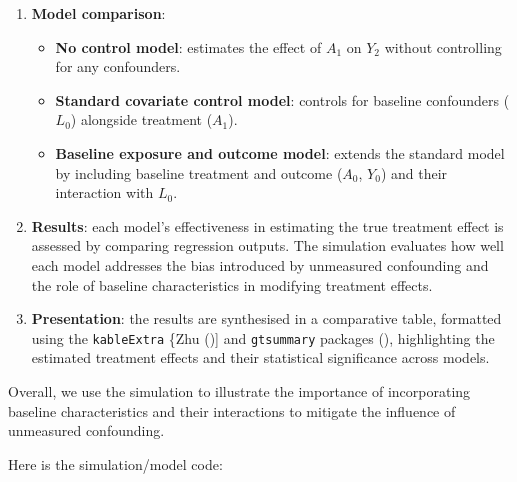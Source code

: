 \documentclass[
  singlecolumn]{article}
\providecommand{\tightlist}{%
  \setlength{\itemsep}{0pt}\setlength{\parskip}{0pt}}\usepackage{longtable,booktabs,array}
\begin{document}
\begin{enumerate}
\def\labelenumi{\arabic{enumi}.}
\setcounter{enumi}{2}
\item
  \textbf{Model comparison}:

  \begin{itemize}
  \tightlist
  \item
    \textbf{No control model}: estimates the effect of \(A_1\) on
    \(Y_2\) without controlling for any confounders.
  \item
    \textbf{Standard covariate control model}: controls for baseline
    confounders (\(L_0\)) alongside treatment (\(A_1\)).
  \item
    \textbf{Baseline exposure and outcome model}: extends the standard
    model by including baseline treatment and outcome (\(A_0\), \(Y_0\))
    and their interaction with \(L_0\).
  \end{itemize}
\item
  \textbf{Results}: each model's effectiveness in estimating the true
  treatment effect is assessed by comparing regression outputs. The
  simulation evaluates how well each model addresses the bias introduced
  by unmeasured confounding and the role of baseline characteristics in
  modifying treatment effects.
\item
  \textbf{Presentation}: the results are synthesised in a comparative
  table, formatted using the \texttt{kableExtra} \{Zhu
  (){]} and \texttt{gtsummary}
  packages (),
  highlighting the estimated treatment effects and their statistical
  significance across models.
\end{enumerate}

Overall, we use the simulation to illustrate the importance of
incorporating baseline characteristics and their interactions to
mitigate the influence of unmeasured confounding.

Here is the simulation/model code:
\end{document}
